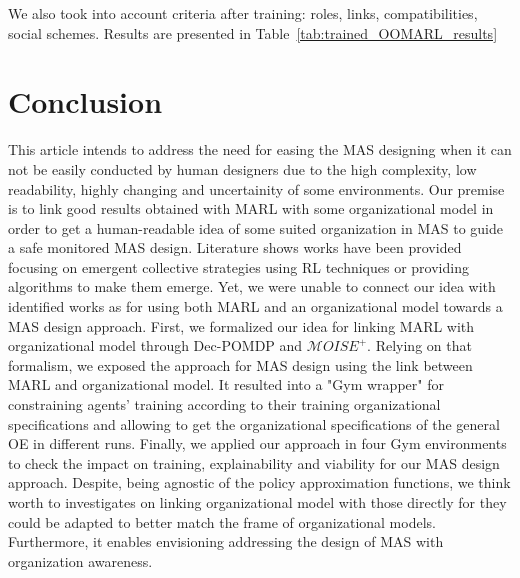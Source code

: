 \documentclass[runningheads]{llncs}
\begin{document}


We also took into account criteria after training: roles, links, compatibilities, social schemes. Results are presented in Table~\ref{tab:trained_OOMARL_results}



\section{Conclusion}


This article intends to address the need for easing the MAS designing when it can not be easily conducted by human designers due to the high complexity, low readability, highly changing and uncertainity of some environments. Our premise is to link good results obtained with MARL with some organizational model in order to get a human-readable idea of some suited organization in MAS to guide a safe monitored MAS design. Literature shows works have been provided focusing on emergent collective strategies using RL techniques or providing algorithms to make them emerge. Yet, we were unable to connect our idea with identified works as for using both MARL and an organizational model towards a MAS design approach. First, we formalized our idea for linking MARL with organizational model through Dec-POMDP and $\mathcal{M}OISE^+$. Relying on that formalism, we exposed the approach for MAS design using the link between MARL and organizational model. It resulted into a "Gym wrapper" for constraining agents' training according to their training organizational specifications and allowing to get the organizational specifications of the general OE in different runs. Finally, we applied our approach in four Gym environments to check the impact on training, explainability and viability for our MAS design approach. Despite, being agnostic of the policy approximation functions, we think worth to investigates on linking organizational model with those directly for they could be adapted to better match the frame of organizational models. Furthermore, it enables envisioning addressing the design of MAS with organization awareness.
\end{document}

